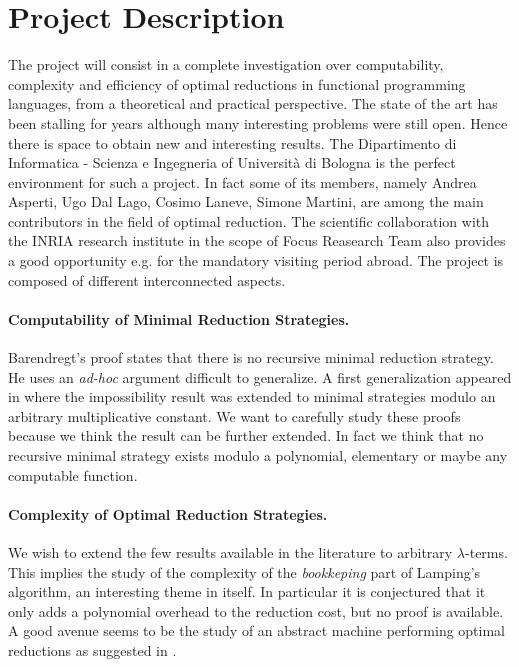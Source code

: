 \documentclass[english]{scrartcl}
\begin{document}
\section{Project Description}
The project will consist in a complete investigation over computability, complexity and efficiency of optimal reductions in functional programming languages, from a theoretical and practical perspective. The state of the art has been stalling for years although many interesting problems were still open. Hence there is space to obtain new and interesting results. The Dipartimento di Informatica - Scienza e Ingegneria of Università di Bologna is the perfect environment for such a project. In fact some of its members, namely Andrea Asperti, Ugo Dal Lago, Cosimo Laneve, Simone Martini, are among the main contributors in the field of optimal reduction. The scientific collaboration with the INRIA research institute in the scope of Focus Reasearch Team also provides a good opportunity e.g. for the mandatory visiting period abroad. The project is composed of different interconnected aspects.
\paragraph{Computability of Minimal Reduction Strategies.}Barendregt's proof \cite[Section~13.5]{barendregt_lambda_1984} states that there is no recursive minimal reduction strategy. He uses an \emph{ad-hoc} argument difficult to generalize. A first generalization appeared in \cite[Appendix]{kathail_optimal_1990} where the impossibility result was extended to minimal strategies modulo an arbitrary multiplicative constant. We want to carefully study these proofs because we think the result can be further extended. In fact we think that no recursive minimal strategy exists modulo a polynomial, elementary or maybe any computable function.
\paragraph{Complexity of Optimal Reduction Strategies.}We wish to extend the few results available in the literature \cite{baillot_light_2011,guerrini_is_2017} to arbitrary $\lambda$-terms. This implies the study of the complexity of the \emph{bookkeping} part of Lamping's algorithm, an interesting theme in itself. In particular it is conjectured that it only adds a polynomial overhead to the reduction cost, but no proof is available. A good avenue seems to be the study of an abstract machine performing optimal reductions as suggested in \cite{danos_reversible_1999}. 
\end{document}
